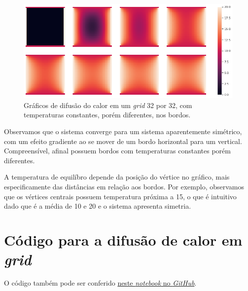 \documentclass{article}
\begin{document}
\begin{itemize}
                \begin{figure}[!h]
                    \includegraphics[width=\textwidth]{graph_2.png}
                    \caption{Gráficos de difusão do calor em um \textit{grid} 32 por 32, com temperaturas constantes, porém diferentes, nos bordos.}
                    \label{fig:graph_2}
                \end{figure}

                Observamos que o sistema converge para um sistema aparentemente simétrico, com um efeito gradiente ao se mover
                de um bordo horizontal para um vertical. Compreensível, afinal possuem bordos com temperaturas constantes porém diferentes.

                A temperatura de equilíbro depende da posição do vértice no gráfico, mais especificamente das distâncias em relação aos bordos.
                Por exemplo, observamos que os vértices centrais possuem temperatura próxima a 15, o que é intuitivo dado que é a média de 10 e 20
                e o sistema apresenta simetria.

        \end{itemize}

    \newpage

    \appendix

    \section{Código para a difusão de calor em \textit{grid}}
        \label{appendix:a}

        O código também pode ser conferido \href{https://github.com/lucasresck/pde/blob/master/list_2/list_2.ipynb}{neste \textit{notebook} no \textit{GitHub}}.
\end{document}
